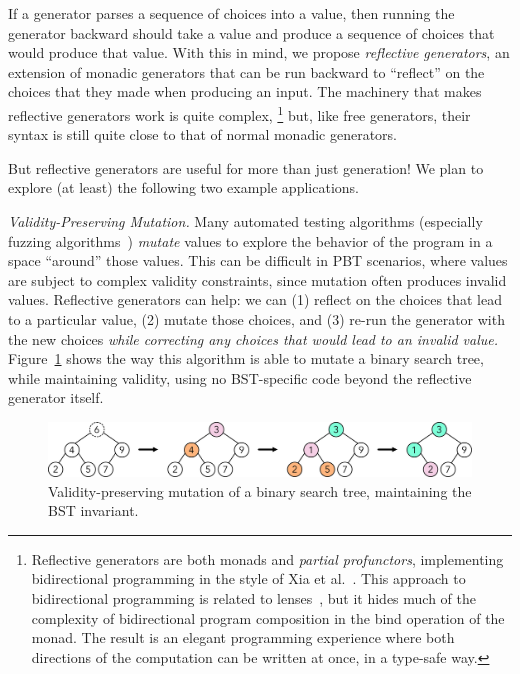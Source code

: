 If a generator parses a sequence of choices into a value, then running the
generator backward should take a value and produce a sequence of choices that
would produce that value. With this in mind, we propose {\em reflective
generators}, an extension of monadic generators that can be run backward to
``reflect'' on the choices that they made when producing an input. The machinery
that makes reflective generators work is quite complex,%
\footnote{Reflective generators are both monads and {\em
    partial profunctors},
implementing bidirectional programming in the style of Xia et
al.~\cite{xia2019composing}. This approach to bidirectional programming is
related to lenses~\cite{foster2009bidirectional}, but it hides much of the
complexity of bidirectional program composition in the bind operation of the
monad. The result is an elegant programming experience where both directions of
the computation can be written at once, in a type-safe way.}
but, like free generators, their syntax is still quite close to that of normal
monadic generators.

But reflective generators are useful for more than just generation!
We plan to explore (at least) the following two example applications.

{\em Validity-Preserving Mutation.}
Many automated testing algorithms
(especially fuzzing algorithms~\cite{afl-readme}) {\em mutate} values to explore
the behavior of the program in a space ``around'' those values. This can be
difficult in PBT scenarios, where values are subject to complex validity
constraints, since mutation often produces invalid values. Reflective
generators can help: we can (1) reflect on the choices that lead to a particular
value, (2) mutate those choices, and (3) re-run the generator with the new
choices {\em while correcting any choices that
would lead to an invalid value.} Figure~\ref{fig:mutation} shows the way this
algorithm is able to mutate a binary search tree, while maintaining validity,
using no BST-specific code beyond the reflective generator itself.

\begin{figure}[h]
  \centering
  \includegraphics[width=.7\textwidth]{assets/mutate-diagram.pdf}
  \caption{Validity-preserving mutation of a binary search tree, maintaining the
  BST invariant.}\label{fig:mutation}
\end{figure}

